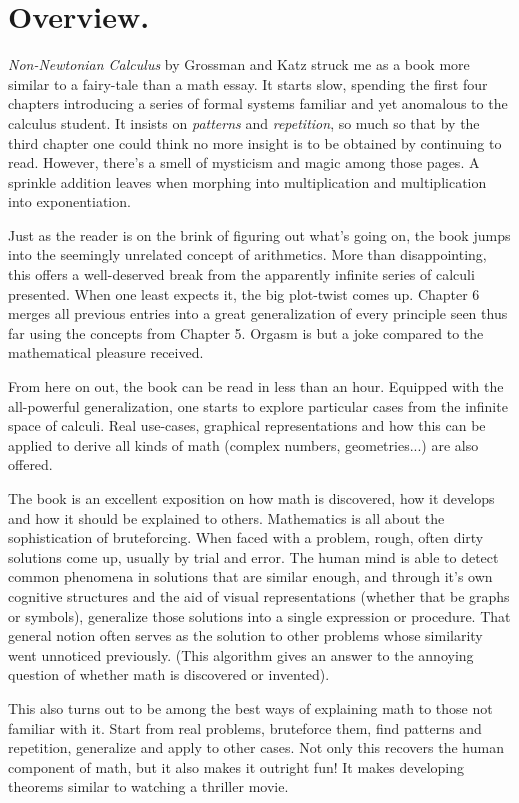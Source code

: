 \section{Overview.}

\textit{Non-Newtonian Calculus} by Grossman and Katz struck me as a book more similar to a fairy-tale than a math essay. It starts slow, spending the first four chapters introducing a series of formal systems familiar and yet anomalous to the calculus student. It insists on \textit{patterns} and \textit{repetition}, so much so that by the third chapter one could think no more insight is to be obtained by continuing to read. However, there's a smell of mysticism and magic among those pages. A sprinkle addition leaves when morphing into multiplication and multiplication into exponentiation.

Just as the reader is on the brink of figuring out what's going on, the book jumps into the seemingly unrelated concept of arithmetics. More than disappointing, this offers a well-deserved break from the apparently infinite series of calculi presented. When one least expects it, the big plot-twist comes up. Chapter 6 merges all previous entries into a great generalization of every principle seen thus far using the concepts from Chapter 5. Orgasm is but a joke compared to the mathematical pleasure received.

From here on out, the book can be read in less than an hour. Equipped with the all-powerful generalization, one starts to explore particular cases from the infinite space of calculi. Real use-cases, graphical representations and how this can be applied to derive all kinds of math (complex numbers, geometries...) are also offered.

The book is an excellent exposition on how math is discovered, how it develops and how it should be explained to others. Mathematics is all about the sophistication of bruteforcing. When faced with a problem, rough, often dirty solutions come up, usually by trial and error. The human mind is able to detect common phenomena in solutions that are similar enough, and through it's own cognitive structures and the aid of visual representations (whether that be graphs or symbols), generalize those solutions into a single expression or procedure. That general notion often serves as the solution to other problems whose similarity went unnoticed previously. (This algorithm gives an answer to the annoying question of whether math is discovered or invented).

This also turns out to be among the best ways of explaining math to those not familiar with it. Start from real problems, bruteforce them, find patterns and repetition, generalize and apply to other cases. Not only this recovers the human component of math, but it also makes it outright fun! It makes developing theorems similar to watching a thriller movie.

